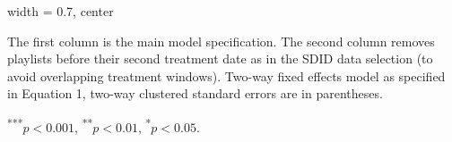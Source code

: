 \begin{table}[htbp]
\begin{adjustbox}{width = 0.7\textwidth, center}
\begin{threeparttable}[b]
         \begin{tablenotes}\footnotesize
            \item The first column is the main model specification. The second column removes playlists before their second treatment date as in the SDID data selection (to avoid overlapping treatment windows). Two-way fixed effects model as specified in Equation 1, two-way clustered standard errors are in parentheses.
            \item \textsuperscript{***}$p<0.001$, 
                             \textsuperscript{**}$p<0.01$, 
                             \textsuperscript{*}$p<0.05$.
         \end{tablenotes}
      \end{threeparttable}
   \end{adjustbox}
\end{table}


